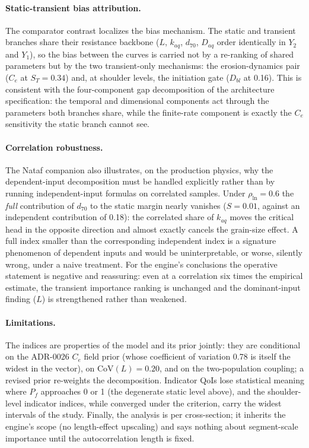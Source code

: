 \paragraph{Static-transient bias attribution.}
The comparator contrast localizes the bias mechanism. The static and
transient branches share their resistance backbone ($L$, $k_{aq}$,
$d_{70}$, $D_{aq}$ order identically in $Y_2$ and $Y_1$), so the bias
between the curves is carried not by a re-ranking of shared parameters but
by the two transient-only mechanisms: the erosion-dynamics pair
($C_e$ at $S_T = 0.34$) and, at shoulder levels, the initiation gate
($D_{bl}$ at 0.16). This is consistent with the four-component gap
decomposition of the architecture specification: the temporal and
dimensional components act through the parameters both branches share,
while the finite-rate component is exactly the $C_e$ sensitivity the
static branch cannot see.

\paragraph{Correlation robustness.}
The Nataf companion also illustrates, on the production physics, why the
dependent-input decomposition must be handled explicitly rather than by
running independent-input formulas on correlated samples. Under
$\rho_{\ln} = 0.6$ the \emph{full} contribution of $d_{70}$ to the static
margin nearly vanishes ($S = 0.01$, against an independent contribution
of 0.18): the correlated share of $k_{aq}$ moves the critical head in the
opposite direction and almost exactly cancels the grain-size effect. A
full index smaller than the corresponding independent index is a
signature phenomenon of dependent inputs
\parencite{mara_tarantola_2012, kucherenko_2012} and would be
uninterpretable, or worse, silently wrong, under a naive treatment. For
the engine's conclusions the operative statement is negative and
reassuring: even at a correlation six times the empirical estimate, the
transient importance ranking is unchanged and the dominant-input finding
($L$) is strengthened rather than weakened.

\paragraph{Limitations.}
The indices are properties of the model and its prior jointly: they are
conditional on the ADR-0026 $C_e$ field prior (whose coefficient of
variation 0.78 is itself the widest in the vector), on
$\mathrm{CoV}(L) = 0.20$, and on the two-population coupling; a revised
prior re-weights the decomposition. Indicator QoIs lose statistical
meaning where $P_f$ approaches 0 or 1 (the degenerate static level above),
and the shoulder-level indicator indices, while converged under the
criterion, carry the widest intervals of the study. Finally, the analysis
is per cross-section; it inherits the engine's scope (no length-effect
upscaling) and says nothing about segment-scale importance until the
autocorrelation length is fixed.

